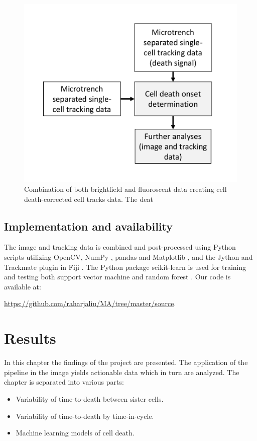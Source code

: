 \documentclass[pdftex,12pt,a4paper]{report}
\begin{document}
\begin{figure}[H]
   \centering
    \includegraphics[height=0.5\textwidth]{images/pipeline/03.pdf}
    \caption{Combination of both brightfield and fluoroscent data creating cell death-corrected cell tracks data. The deat}
    \label{fig:pipeline3}
\end{figure}

\section{Implementation and availability}

The image and tracking data is combined and post-processed using Python scripts utilizing OpenCV\cite{bradski2008learning}, NumPy \cite{walt2011numpy}, pandas \cite{mckinney2010data} and Matplotlib \cite{hunter2007matplotlib}, and the Jython and Trackmate \cite{tinevez2017trackmate, pedroni2002jython} plugin in Fiji \cite{schindelin2012fiji}. The Python package scikit-learn is used for training and testing both support vector machine and random forest \cite{scikit-learn}. Our code is available at:

\href{https://github.com/raharjaliu/MA/tree/master/source}{https://github.com/raharjaliu/MA/tree/master/source}.

\chapter{Results}

In this chapter the findings of the project are presented. The application of the pipeline in the image yields actionable data which in turn are analyzed. The chapter is separated into various parts:

\begin{itemize}
\item Variability of time-to-death between sister cells.
\item Variability of time-to-death by time-in-cycle.
\item Machine learning models of cell death.
\end{itemize}
\end{document}
